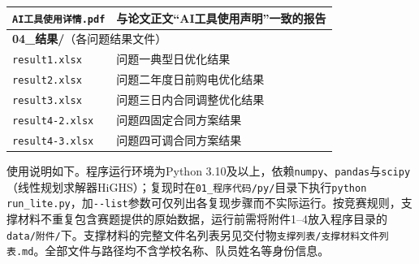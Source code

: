 {\begin{longtable}{p{}p{}}
\texttt{AI工具使用详情.pdf} & 与论文正文“AI工具使用声明”一致的报告 \\
\midrule
\multicolumn{2}{l}{\textbf{04\_结果/}（各问题结果文件）} \\
\texttt{result1.xlsx} & 问题一典型日优化结果 \\
\texttt{result2.xlsx} & 问题二年度日前购电优化结果 \\
\texttt{result3.xlsx} & 问题三日内合同调整优化结果 \\
\texttt{result4-2.xlsx} & 问题四固定合同方案结果 \\
\texttt{result4-3.xlsx} & 问题四可调合同方案结果 \\
\bottomrule
\end{longtable}
}

使用说明如下。程序运行环境为Python 3.10及以上，依赖\texttt{numpy}、\texttt{pandas}与\texttt{scipy}（线性规划求解器HiGHS）；复现时在\texttt{01\_程序代码/py/}目录下执行\texttt{python run\_lite.py}，加\texttt{-{}-list}参数可仅列出各复现步骤而不实际运行。按竞赛规则，支撑材料不重复包含赛题提供的原始数据，运行前需将附件1--4放入程序目录的\texttt{data/附件/}下。支撑材料的完整文件名列表另见交付物\texttt{支撑列表/支撑材料文件列表.md}。全部文件与路径均不含学校名称、队员姓名等身份信息。

